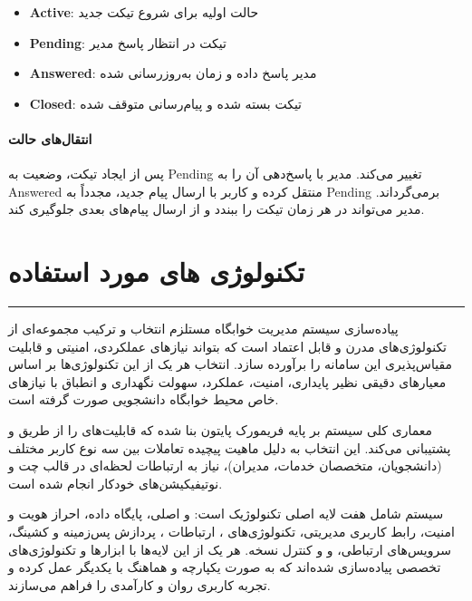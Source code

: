\documentclass[12pt,a4paper]{report}
\begin{document}
	\begin{itemize}
		\item \textbf{Active}: حالت اولیه برای شروع تیکت جدید
		\item \textbf{Pending}: تیکت در انتظار پاسخ مدیر
		\item \textbf{Answered}: مدیر پاسخ داده و زمان به‌روزرسانی شده
		\item \textbf{Closed}: تیکت بسته شده و پیام‌رسانی متوقف شده
	\end{itemize}
	
	\subsubsection*{انتقال‌های حالت}
	
	پس از ایجاد تیکت، وضعیت به Pending تغییر می‌کند. مدیر با پاسخ‌دهی آن را به Answered منتقل کرده و کاربر با ارسال پیام جدید، مجدداً به Pending برمی‌گرداند. مدیر می‌تواند در هر زمان تیکت را ببندد و از ارسال پیام‌های بعدی جلوگیری کند.
	
	
	\chapter{تکنولوژی های مورد استفاده}
	\vspace{-2.5\baselineskip}
	\noindent\rule{\textwidth}{0.4pt}
	
	پیاده‌سازی سیستم مدیریت خوابگاه مستلزم انتخاب و ترکیب مجموعه‌ای از تکنولوژی‌های مدرن و قابل اعتماد است که بتواند نیازهای عملکردی، امنیتی و قابلیت مقیاس‌پذیری این سامانه را برآورده سازد. انتخاب هر یک از این تکنولوژی‌ها بر اساس معیارهای دقیقی نظیر پایداری، امنیت، عملکرد، سهولت نگهداری و انطباق با نیازهای خاص محیط خوابگاه دانشجویی صورت گرفته است.
	
	معماری کلی سیستم بر پایه فریمورک  پایتون بنا شده که قابلیت‌های  را از طریق  و  پشتیبانی می‌کند. این انتخاب به دلیل ماهیت پیچیده تعاملات بین سه نوع کاربر مختلف (دانشجویان، متخصصان خدمات، مدیران)، نیاز به ارتباطات لحظه‌ای در قالب چت و نوتیفیکیشن‌های خودکار انجام شده است.
	
	سیستم شامل هفت لایه اصلی تکنولوژیک است:  و  اصلی، پایگاه داده، احراز هویت و امنیت، رابط کاربری مدیریتی، تکنولوژی‌های ، ارتباطات ، پردازش پس‌زمینه و کشینگ، سرویس‌های ارتباطی،  و  و کنترل نسخه. هر یک از این لایه‌ها با ابزارها و تکنولوژی‌های تخصصی پیاده‌سازی شده‌اند که به صورت یکپارچه و هماهنگ با یکدیگر عمل کرده و تجربه کاربری روان و کارآمدی را فراهم می‌سازند.
	
\end{document}
